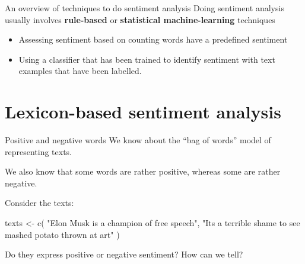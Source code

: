 \documentclass[
  10pt,
  ignorenonframetext,
  aspectratio=169]{beamer}
\newenvironment{Shaded}{\begin{snugshade}}{\end{snugshade}}
\newcommand{\FunctionTok}[1]{\textcolor[rgb]{0.94,0.94,0.56}{#1}}
\newcommand{\NormalTok}[1]{\textcolor[rgb]{0.80,0.80,0.80}{#1}}
\newcommand{\OtherTok}[1]{\textcolor[rgb]{0.94,0.94,0.56}{#1}}
\newcommand{\StringTok}[1]{\textcolor[rgb]{0.80,0.58,0.58}{#1}}
\begin{document}
\begin{frame}{An overview of techniques to do sentiment analysis}
\protect\hypertarget{an-overview-of-techniques-to-do-sentiment-analysis}{}
Doing sentiment analysis usually involves \textbf{rule-based} or
\textbf{statistical machine-learning} techniques

\begin{itemize}
  \item<2->Assessing sentiment based on counting words have a predefined sentiment
  \item<3->Using a classifier that has been trained to identify sentiment with text examples that have been labelled.
\end{itemize}
\end{frame}

\hypertarget{lexicon-based-sentiment-analysis}{%
\section{Lexicon-based sentiment
analysis}\label{lexicon-based-sentiment-analysis}}

\begin{frame}[fragile]{Positive and negative words}
\protect\hypertarget{positive-and-negative-words}{}
We know about the ``bag of words'' model of representing texts.

We also know that some words are rather positive, whereas some are
rather negative.

Consider the texts:

\medskip

\begin{Shaded}
\begin{Highlighting}[]
\NormalTok{texts }\OtherTok{\textless{}{-}} \FunctionTok{c}\NormalTok{(}
  \StringTok{"Elon Musk is a champion of free speech"}\NormalTok{,}
  \StringTok{"It\textquotesingle{}s a terrible shame to see mashed potato thrown at art"}
\NormalTok{)}
\end{Highlighting}
\end{Shaded}

\medskip

Do they express positive or negative sentiment? How can we tell?
\end{frame}
\end{document}
